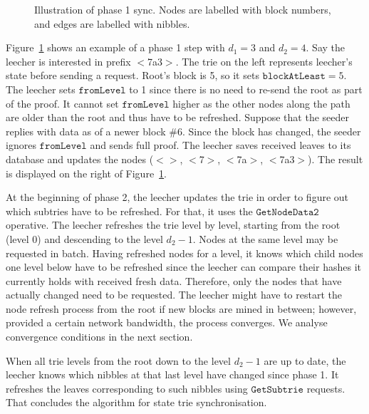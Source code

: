 \documentclass{amsart}
\begin{document}
\begin{figure}
\caption{Illustration of phase 1 sync. Nodes are labelled with block numbers, and edges are labelled with nibbles.}
\label{fig:phase1_example}
\end{figure}

Figure~\ref{fig:phase1_example} shows an example of a phase 1 step with $d_1 = 3$ and $d_2 = 4$.
Say the leecher is interested in prefix $<$7a3$>$.
The trie on the left represents leecher's state before sending a request.
Root's block is 5, so it sets $\texttt{blockAtLeast} = 5$.
The leecher sets $\texttt{fromLevel}$ to 1 since there is no need to re-send the root as part of the proof.
It cannot set $\texttt{fromLevel}$ higher as the other nodes along the path are older than the root and thus have to be refreshed.
Suppose that the seeder replies with data as of a newer block \#6.
Since the block has changed, the seeder ignores $\texttt{fromLevel}$ and sends full proof.
The leecher saves received leaves to its database and updates the nodes  ($<>$, $<$7$>$, $<$7a$>$, $<$7a3$>$).
The result is displayed on the right of Figure~\ref{fig:phase1_example}.

At the beginning of phase 2, the leecher updates the trie in order to figure out which subtries have to be refreshed.
For that, it uses the $\texttt{GetNodeData2}$ operative.
The leecher refreshes the trie level by level, starting from the root (level 0) and descending to the level $d_2 - 1$.
Nodes at the same level may be requested in batch.
Having refreshed nodes for a level, it knows which child nodes one level below have to be refreshed since the leecher can compare their hashes it currently holds with received fresh data.
Therefore, only the nodes that have actually changed need to be requested.
The leecher might have to restart the node refresh process from the root if new blocks are mined in between;
however, provided a certain network bandwidth, the process converges.
We analyse convergence conditions in the next section.

When all trie levels from the root down to the level $d_2 - 1$ are up to date,
the leecher knows which nibbles at that last level have changed since phase 1.
It refreshes the leaves corresponding to such nibbles using $\texttt{GetSubtrie}$ requests. 
That concludes the algorithm for state trie synchronisation.
\end{document}
